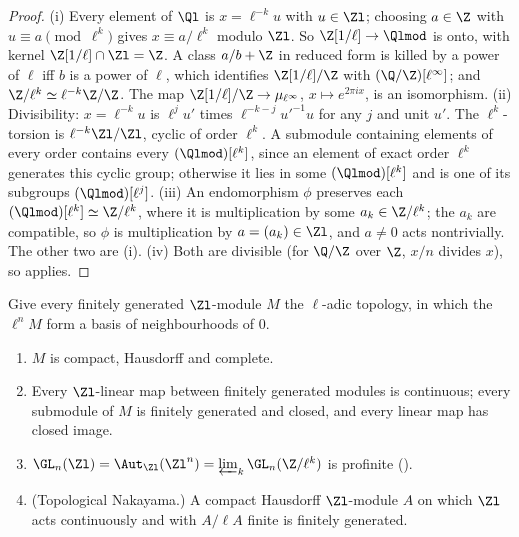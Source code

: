 \begin{proof}
(i) Every element of $\Ql$ is $x=\ell^{-k}u$ with $u\in\Zl$; choosing $a\in\Z$ with $u\equiv a\pmod{\ell^k}$ gives $x\equiv a/\ell^k$ modulo $\Zl$. So
$\Z[1/\ell]\to\Qlmod$ is onto, with kernel $\Z[1/\ell]\cap\Zl=\Z$. A class $a/b+\Z$ in reduced form is killed by a power of $\ell$ iff $b$ is a power of
$\ell$, which identifies $\Z[1/\ell]/\Z$ with $(\Q/\Z)[\ell^\infty]$; and $\Z/\ell^k\simeq\ell^{-k}\Z/\Z$. The map $\Z[1/\ell]/\Z\to\mu_{\ell^\infty}$,
$x\mapsto e^{2\pi ix}$, is an isomorphism.
(ii) Divisibility: $x=\ell^{-k}u$ is $\ell^ju'$ times $\ell^{-k-j}u'^{-1}u$ for any $j$ and unit $u'$. The $\ell^k$-torsion is $\ell^{-k}\Zl/\Zl$, cyclic of order
$\ell^k$. A submodule containing elements of every order contains every $(\Qlmod)[\ell^k]$, since an element of exact order $\ell^k$
generates this cyclic group; otherwise it lies in some $(\Qlmod)[\ell^k]$ and is one of its subgroups $(\Qlmod)[\ell^j]$.
(iii) An endomorphism $\phi$ preserves each $(\Qlmod)[\ell^k]\simeq\Z/\ell^k$, where it is multiplication by some $a_k\in\Z/\ell^k$; the $a_k$ are compatible,
so $\phi$ is multiplication by $a=(a_k)\in\Zl$, and $a\ne0$ acts nontrivially. The other two are (i).
(iv) Both are divisible (for $\Q/\Z$ over $\Z$, $x/n$ divides $x$), so  applies.
\end{proof}

\begin{proposition}\label{prop:modules:zl-topology}
Give every finitely generated $\Zl$-module $M$ the $\ell$-adic topology, in which the $\ell^nM$ form a basis of neighbourhoods of $0$.
\begin{enumerate}[label=(\roman*)]
\item $M$ is compact, Hausdorff and complete.
\item Every $\Zl$-linear map between finitely generated modules is continuous; every submodule of $M$ is finitely generated and
closed, and every linear map has closed image.
\item $\GL_n(\Zl)=\Aut_{\Zl}(\Zl^n)=\varprojlim_k\GL_n(\Z/\ell^k)$ is profinite ().
\item (Topological Nakayama.) A compact Hausdorff $\Zl$-module $A$ on which $\Zl$ acts continuously and with $A/\ell A$ finite is finitely
generated.
\end{enumerate}
\end{proposition}

